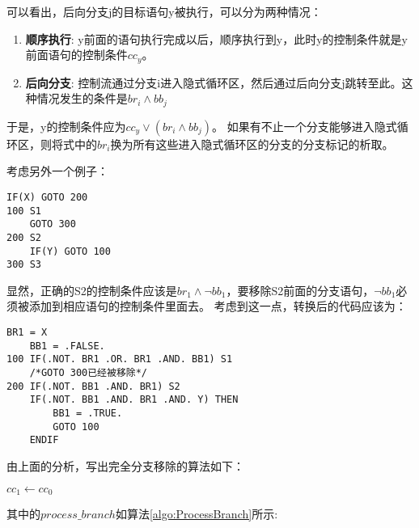 \documentclass[11pt,a4paper]{article}
\begin{document}
可以看出，后向分支j的目标语句y被执行，可以分为两种情况：
\begin{enumerate}
\item \textbf{顺序执行}:
y前面的语句执行完成以后，顺序执行到y，此时y的控制条件就是y前面语句的控制条件$cc_y$。
\item \textbf{后向分支}:
控制流通过分支i进入隐式循环区，然后通过后向分支j跳转至此。这种情况发生的条件是$br_i\wedge bb_j$
\end{enumerate}
于是，y的控制条件应为$cc_y\vee\left(br_i\wedge bb_j\right)$。
如果有不止一个分支能够进入隐式循环区，则将式中的$br_i$换为所有这些进入隐式循环区的分支的分支标记的析取。

考虑另外一个例子：
\begin{lstlisting}[language=FORTRAN]
	IF(X) GOTO 200
100	S1
	GOTO 300
200	S2
	IF(Y) GOTO 100
300	S3
\end{lstlisting}
显然，正确的S2的控制条件应该是$br_1\wedge \neg bb_1$，要移除S2前面的分支语句，$\neg bb_1$必须被添加到相应语句的控制条件里面去。
考虑到这一点，转换后的代码应该为：
\begin{lstlisting}[language=FORTRAN]
	BR1 = X
	BB1 = .FALSE.
100	IF(.NOT. BR1 .OR. BR1 .AND. BB1) S1
	/*GOTO 300已经被移除*/
200	IF(.NOT. BB1 .AND. BR1) S2
	IF(.NOT. BB1 .AND. BR1 .AND. Y) THEN
		BB1 = .TRUE.
		GOTO 100
	ENDIF
\end{lstlisting}
由上面的分析，写出完全分支移除的算法如下：

\begin{algorithm}[H]
	\label{algo:CompleteBranchRemoval}
	\caption{$remove\_branches\left(x,cc_0\right)$}

	$cc_1\leftarrow cc_0$\;
\end{algorithm}
其中的$process\_branch$如算法\ref{algo:ProcessBranch}所示:
\end{document}
